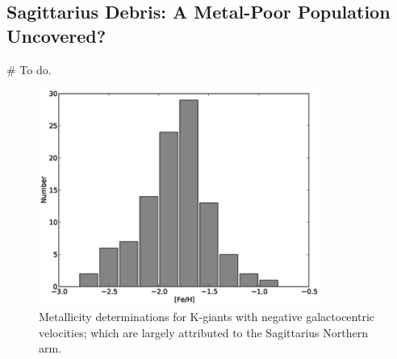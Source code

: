 \documentclass{emulateapj}
\begin{document}
	



\subsection{Sagittarius Debris: A Metal-Poor Population Uncovered?}
\label{sec:sgr-metal-poor}

\# To do.	
	\begin{figure}[h!]
		\centering
		\includegraphics[width=9.2cm]{./figures/fehhist_copy.eps}
		\caption{Metallicity determinations for K-giants with negative galactocentric velocities; which are largely attributed to the Sagittarius Northern arm.}
		\label{fig:sgr-metallicity-hist}
	\end{figure}
	
\end{document}
